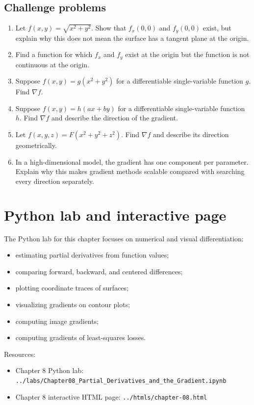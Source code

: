 \documentclass[11pt]{article}
\newcommand{\grad}{\nabla}
\begin{document}
\subsection*{Challenge problems}
\begin{enumerate}[start=27]
  \item Let $f(x,y)=\sqrt{x^2+y^2}$. Show that $f_x(0,0)$ and $f_y(0,0)$ exist, but explain why this does not mean the surface has a tangent plane at the origin.
  \item Find a function for which $f_x$ and $f_y$ exist at the origin but the function is not continuous at the origin.
  \item Suppose $f(x,y)=g(x^2+y^2)$ for a differentiable single-variable function $g$. Find $\grad f$.
  \item Suppose $f(x,y)=h(ax+by)$ for a differentiable single-variable function $h$. Find $\grad f$ and describe the direction of the gradient.
  \item Let $f(x,y,z)=F(x^2+y^2+z^2)$. Find $\grad f$ and describe its direction geometrically.
  \item In a high-dimensional model, the gradient has one component per parameter. Explain why this makes gradient methods scalable compared with searching every direction separately.
\end{enumerate}

\section{Python lab and interactive page}

The Python lab for this chapter focuses on numerical and visual differentiation:
\begin{itemize}
  \item estimating partial derivatives from function values;
  \item comparing forward, backward, and centered differences;
  \item plotting coordinate traces of surfaces;
  \item visualizing gradients on contour plots;
  \item computing image gradients;
  \item computing gradients of least-squares losses.
\end{itemize}

Resources:
\begin{itemize}
  \item Chapter 8 Python lab: \texttt{../labs/Chapter08\_Partial\_Derivatives\_and\_the\_Gradient.ipynb}
  \item Chapter 8 interactive HTML page: \texttt{../htmls/chapter-08.html}
\end{itemize}
\end{document}
